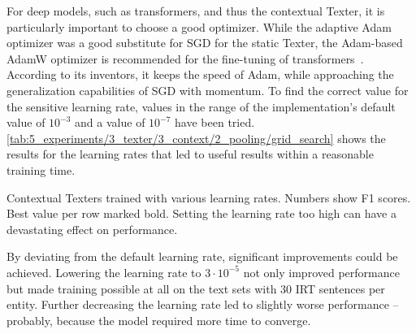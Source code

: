 For deep models, such as transformers, and thus the contextual Texter, it is particularly important to choose a good optimizer. While the adaptive Adam optimizer was a good substitute for SGD for the static Texter, the Adam-based AdamW optimizer is recommended for the fine-tuning of transformers~\cite{Loshchilov2019DecoupledWD}. According to its inventors, it keeps the speed of Adam, while approaching the generalization capabilities of SGD with momentum. To find the correct value for the sensitive learning rate, values in the range of the implementation's default value of $10^{-3}$ and a value of $10^{-7}$ have been tried. \autoref{tab:5_experiments/3_texter/3_context/2_pooling/grid_search} shows the results for the learning rates that led to useful results within a reasonable training time.

\begin{table}[t!]
    \makebox[\textwidth][c]{
        
    }
    \caption{Contextual Texters trained with various learning rates. Numbers show F1 scores. Best value per row marked bold. Setting the learning rate too high can have a devastating effect on performance.}
    \label{tab:5_experiments/3_texter/3_context/3_optimizer/grid_search}
\end{table}

By deviating from the default learning rate, significant improvements could be achieved. Lowering the learning rate to $3 \cdot 10^{-5}$ not only improved performance but made training possible at all on the text sets with 30 IRT sentences per entity. Further decreasing the learning rate led to slightly worse performance -- probably, because the model required more time to converge.

